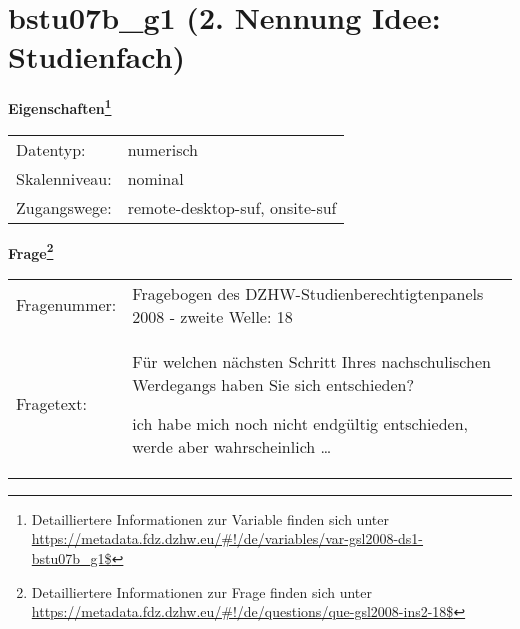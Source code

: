 
    \setcounter{footnote}{0}

    \vspace*{-1.8cm}
	\section{bstu07b\_g1 (2. Nennung Idee: Studienfach)}
	\label{section:bstu07b_g1}



    \vspace*{0.5cm}
    \noindent\textbf{Eigenschaften\footnote{Detailliertere Informationen zur Variable finden sich unter
		\url{https://metadata.fdz.dzhw.eu/\#!/de/variables/var-gsl2008-ds1-bstu07b_g1$}}}\\
	\begin{tabularx}{\hsize}{@{}lX}
	Datentyp: & numerisch \\
	Skalenniveau: & nominal \\
	Zugangswege: &
	  remote-desktop-suf, 
	  onsite-suf
 \\
    \end{tabularx}



				\vspace*{0.5cm}
                \noindent\textbf{Frage\footnote{Detailliertere Informationen zur Frage finden sich unter
		              \url{https://metadata.fdz.dzhw.eu/\#!/de/questions/que-gsl2008-ins2-18$}}}\\
				\begin{tabularx}{\hsize}{@{}lX}
					Fragenummer: &
					  Fragebogen des DZHW-Studienberechtigtenpanels 2008 - zweite Welle:
					  18
 \\
					Fragetext: & Für welchen nächsten Schritt Ihres nachschulischen Werdegangs haben Sie sich entschieden?\par  ich habe mich noch nicht endgültig entschieden, werde aber wahrscheinlich … \\
				\end{tabularx}





